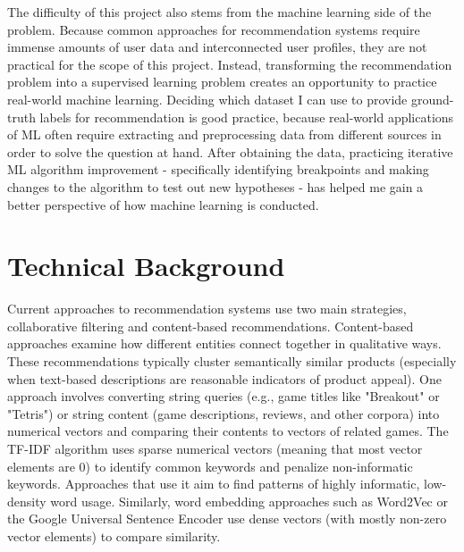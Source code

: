 \documentclass[10pt,twocolumn]{article}
\begin{document}
The difficulty of this project also stems from the machine learning side of the problem. Because common approaches for recommendation systems require immense amounts of user data and interconnected user profiles, they are not practical for the scope of this project. Instead, transforming the recommendation problem into a supervised learning problem creates an opportunity to practice real-world machine learning. Deciding which dataset I can use to provide ground-truth labels for recommendation is good practice, because real-world applications of ML often require extracting and preprocessing data from different sources in order to solve the question at hand. After obtaining the data, practicing iterative ML algorithm improvement - specifically identifying breakpoints and making changes to the algorithm to test out new hypotheses - has helped me gain a better perspective of how machine learning is conducted.

\section{Technical Background}


Current approaches to recommendation systems use two main strategies, collaborative filtering and content-based recommendations. Content-based approaches examine how different entities connect together in qualitative ways. These recommendations typically cluster semantically similar products (especially when text-based descriptions are reasonable indicators of product appeal). One approach involves converting string queries (e.g., game titles like "Breakout" or "Tetris") or string content (game descriptions, reviews, and other corpora) into numerical vectors and comparing their contents to vectors of related games. The TF-IDF algorithm uses sparse numerical vectors (meaning that most vector elements are 0) to identify common keywords and penalize non-informatic keywords. Approaches that use it aim to find patterns of highly informatic, low-density word usage. \cite{Meidl, Zhang, DWang} Similarly, word embedding approaches such as Word2Vec \cite{Word2Vec} or the Google Universal Sentence Encoder \cite{SentenceEncoder} use dense vectors (with mostly non-zero vector elements) to compare similarity.
\end{document}

